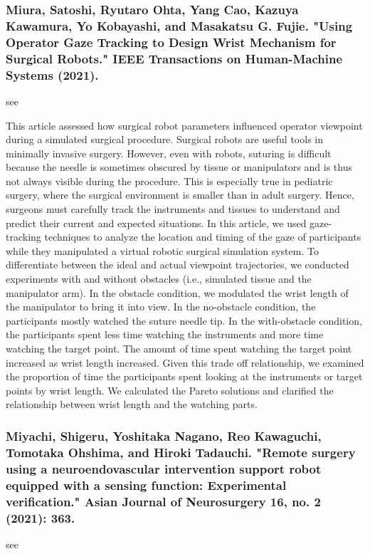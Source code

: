 \documentclass[conference]{IEEEtran}
\begin{document}
\medskip
\subsubsection{Miura, Satoshi, Ryutaro Ohta, Yang Cao, Kazuya Kawamura, Yo Kobayashi, and Masakatsu G. Fujie. "Using Operator Gaze Tracking to Design Wrist Mechanism for Surgical Robots." IEEE Transactions on Human-Machine Systems (2021).}
see \cite{miura2021using}

This article assessed how surgical robot parameters influenced operator viewpoint during a simulated surgical procedure. Surgical robots are useful tools in minimally invasive surgery. However, even with robots, suturing is difficult because the needle is sometimes obscured by tissue or manipulators and is thus not always visible during the procedure. This is especially true in pediatric surgery, where the surgical environment is smaller than in adult surgery. Hence, surgeons must carefully track the instruments and tissues to understand and predict their current and expected situations. In this article, we used gaze-tracking techniques to analyze the location and timing of the gaze of participants while they manipulated a virtual robotic surgical simulation system. To differentiate between the ideal and actual viewpoint trajectories, we conducted experiments with and without obstacles (i.e., simulated tissue and the manipulator arm). In the obstacle condition, we modulated the wrist length of the manipulator to bring it into view. In the no-obstacle condition, the participants mostly watched the suture needle tip. In the with-obstacle condition, the participants spent less time watching the instruments and more time watching the target point. The amount of time spent watching the target point increased as wrist length increased. Given this trade off relationship, we examined the proportion of time the participants spent looking at the instruments or target points by wrist length. We calculated the Pareto solutions and clarified the relationship between wrist length and the watching parts.

\medskip
\subsubsection{Miyachi, Shigeru, Yoshitaka Nagano, Reo Kawaguchi, Tomotaka Ohshima, and Hiroki Tadauchi. "Remote surgery using a neuroendovascular intervention support robot equipped with a sensing function: Experimental verification." Asian Journal of Neurosurgery 16, no. 2 (2021): 363.}
see \cite{miyachi2021remote}
\end{document}
